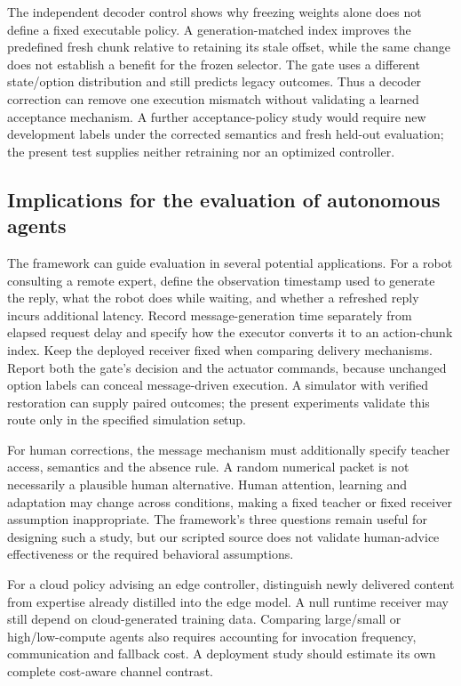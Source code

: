 The independent decoder control shows why freezing weights alone does not define a fixed executable policy. A generation-matched index improves the predefined fresh chunk relative to retaining its stale offset, while the same change does not establish a benefit for the frozen selector. The gate uses a different state/option distribution and still predicts legacy outcomes. Thus a decoder correction can remove one execution mismatch without validating a learned acceptance mechanism. A further acceptance-policy study would require new development labels under the corrected semantics and fresh held-out evaluation; the present test supplies neither retraining nor an optimized controller.

\subsection{Implications for the evaluation of autonomous agents}\label{sec:implications}
The framework can guide evaluation in several potential applications. For a robot consulting a remote expert, define the observation timestamp used to generate the reply, what the robot does while waiting, and whether a refreshed reply incurs additional latency. Record message-generation time separately from elapsed request delay and specify how the executor converts it to an action-chunk index. Keep the deployed receiver fixed when comparing delivery mechanisms. Report both the gate's decision and the actuator commands, because unchanged option labels can conceal message-driven execution. A simulator with verified restoration can supply paired outcomes; the present experiments validate this route only in the specified simulation setup.

For human corrections, the message mechanism must additionally specify teacher access, semantics and the absence rule. A random numerical packet is not necessarily a plausible human alternative. Human attention, learning and adaptation may change across conditions, making a fixed teacher or fixed receiver assumption inappropriate. The framework's three questions remain useful for designing such a study, but our scripted source does not validate human-advice effectiveness or the required behavioral assumptions.

For a cloud policy advising an edge controller, distinguish newly delivered content from expertise already distilled into the edge model. A null runtime receiver may still depend on cloud-generated training data. Comparing large/small or high/low-compute agents also requires accounting for invocation frequency, communication and fallback cost. A deployment study should estimate its own complete cost-aware channel contrast.

